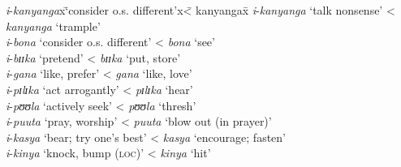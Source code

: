 \begin{exe}
	\ex\begin{tabbing}
		\textit{i}-\textit{kanyanga}x\= \lq consider o.s. different'x\= < kanyangax\=\kill
		\textit{i}-\textit{kanyanga} \> \lq talk nonsense' \> < \textit{kanyanga} \> \lq trample'\\
		\textit{i}-\textit{bona} \> \lq consider o.s. different' \> < \textit{bona} \> \lq see'\\
		\textit{i}-\textit{bɪɪka} \> \lq pretend' \> < \textit{bɪɪka} \> \lq put, store'\\
		\textit{i}-\textit{gana} \> \lq like, prefer' \> < \textit{gana} \> \lq like, love'\\
		\textit{i}-\textit{pɪlɪka} \> \lq act arrogantly' \> < \textit{pɪlɪka} \> \lq hear'\\
		\textit{i}-\textit{pʊʊla} \> \lq actively seek' \> < \textit{pʊʊla} \> \lq thresh'\\
		\textit{i}-\textit{puuta} \> \lq pray, worship' \> < \textit{puuta} \> \lq blow out (in prayer)'\\
		\textit{i}-\textit{kasya} \> \lq bear; try one's best' \> < \textit{kasya} \> \lq encourage; fasten'\\
		\textit{i}-\textit{kinya} \> \lq knock, bump (\textsc{loc})'\> < \textit{kinya} \>\lq hit'
	\end{tabbing}
\end{exe}

